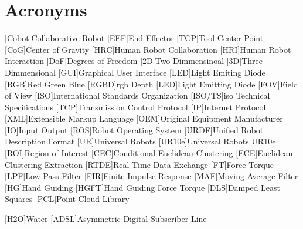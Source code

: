 \chapter{Acronyms}

\footnotesize
\SingleSpacing

\begin{multicols}{2}
\begin{acronym}[AAAAAA]

    [Cobot]{Collaborative Robot}
    [EEF]{End Effector}
    [TCP]{Tool Center Point}
    [CoG]{Center of Gravity}
    [HRC]{Human Robot Collaboration}
    [HRI]{Human Robot Interaction}
    [DoF]{Degrees of Freedom}
    [2D]{Two Dimmensinoal}
    [3D]{Three Dimmensional}
    [GUI]{Graphical User Interface}
    [LED]{Light Emiting Diode}
    [RGB]{Red Green Blue}
    [RGBD]{\acs{rgb} Depth}
    [LED]{Light Emitting Diode}
    [FOV]{Field of View}
    [ISO]{International Standards Organization}
    [ISO/TS]{\acs{iso} Technical Specifications}
    [TCP]{Transmission Control Protocol}
    [IP]{Internet Protocol}
    [XML]{Extensible Markup Language}
    [OEM]{Original Equipment Manufacturer}
    [IO]{Input Output}
    [ROS]{Robot Operating System}
    [URDF]{Unified Robot Description Format}
    [UR]{Universal Robots}
    [UR10e]{Universal Robots UR10e}
    [ROI]{Region of Interest}
    [CEC]{Conditional Euclidean Clustering}
    [ECE]{Euclidean Clustering Extraction}
    [RTDE]{Real Time Data Exchange}
    [FT]{Force Torque}
    [LPF]{Low Pass Filter}
    [FIR]{Finite Impulse Response}
    [MAF]{Moving Average Filter}
    [HG]{Hand Guiding}
    [HGFT]{Hand Guiding Force Torque}
    [DLS]{Damped Least Squares}
    [PCL]{Point Cloud Library}

	[H2O]{Water}
	[ADSL]{Asymmetric Digital Subscriber Line}

\end{acronym}
\end{multicols}

